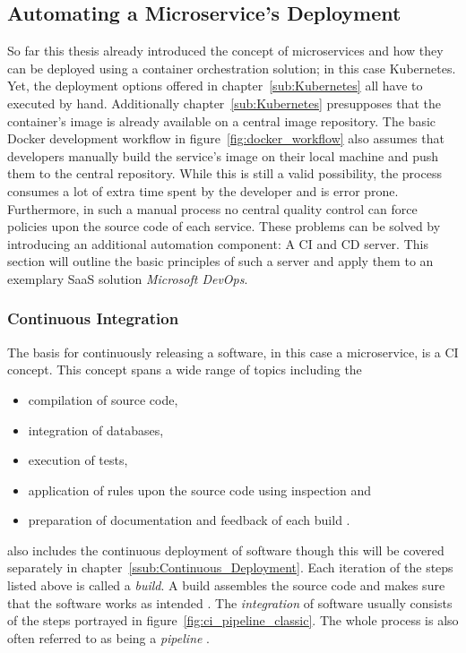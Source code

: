 
\subsection{Automating a Microservice's Deployment}%
\label{sub:Automatic_a_Microservices_Deployment}
So far this thesis already introduced the concept of microservices and how they
can be deployed using a container orchestration solution; in this case
Kubernetes. Yet, the deployment options offered in chapter~\ref{sub:Kubernetes}
all have to executed by hand. Additionally chapter~\ref{sub:Kubernetes}
presupposes that the container's image is already available on a central image
repository. The basic Docker development workflow in
figure~\ref{fig:docker_workflow} also assumes that developers manually build
the service's image on their local machine and push them to the central
repository. While this is still a valid possibility, the process consumes a lot
of extra time spent by the developer and is error prone. Furthermore, in such a
manual process no central quality control can force policies upon the source
code of each service. These problems can be solved by introducing an additional
automation component: A \acf{CI} and \ac{CD} server. This section will outline
the basic principles of such a server and apply them to an exemplary \ac{SaaS}
solution \textit{Microsoft DevOps}.

\subsubsection{Continuous Integration}%
\label{ssub:Continuous_Integration}
The basis for continuously releasing a software, in this case a microservice,
is a \ac{CI} concept. This concept spans a wide range of topics including the
\begin{itemize}
  \item compilation of source code,
  \item integration of databases,
  \item execution of tests,
  \item application of rules upon the source code using inspection and
  \item preparation of documentation and feedback of each build \autocite[pp.
    12-20]{MatyasContinuousIntegration2007}.
\end{itemize}

\autocite{MatyasContinuousIntegration2007} also includes the continuous
deployment of software though this will be covered separately in
chapter~\ref{ssub:Continuous_Deployment}. Each iteration of the steps listed
above is called a \textit{build}. A build assembles the source code and makes
sure that the software works as intended \autocite[p.
4]{MatyasContinuousIntegration2007}. The \textit{integration} of software
usually consists of the steps portrayed in
figure~\ref{fig:ci_pipeline_classic}. The whole process is also often referred
to as being a \textit{pipeline} .

